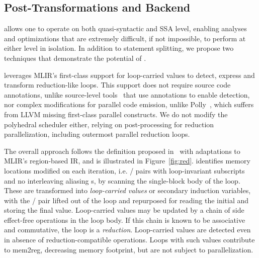 \subsection{Post-Transformations and Backend}\label{sec:opts}

\tool allows one to operate on both quasi-syntactic and SSA level, enabling analyses and optimizations that are extremely difficult, if not impossible, to perform at either level in isolation. In addition to statement splitting, we propose two techniques that demonstrate the potential of \tool.%


\tool leverages MLIR's first-class support for loop-carried values to detect, express and transform reduction-like loops. This support does not require source code annotations, unlike source-level tools~\cite{reduction_drawing} that use annotations to enable detection, nor complex modifications for parallel code emission, unlike Polly~\cite{polly_reduction}, which suffers from LLVM missing first-class parallel constructs. We do not modify the polyhedral scheduler either, relying on post-processing for reduction parallelization, including outermost parallel reduction loops.

The overall approach follows the definition proposed in~\cite{10.1145/318789.318810} with adaptations to MLIR's region-based IR, and is illustrated in Figure~\ref{fig:red}. \tool identifies memory locations modified on each iteration, i.e. / pairs with loop-invariant subscripts and no interleaving aliasing s, by scanning the single-block body of the loop. These are transformed into \emph{loop-carried values} or secondary induction variables, with the / pair lifted out of the loop and repurposed for reading the initial and storing the final value. Loop-carried values may be updated by a chain of side effect-free operations in the loop body. If this chain is known to be associative and commutative, the loop is a \emph{reduction}. Loop-carried values are detected even in absence of reduction-compatible operations. Loops with such values contribute to mem2reg, decreasing memory footprint, but are not subject to parallelization.


